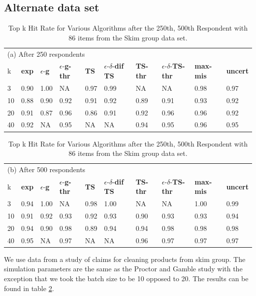 \documentclass[a4paper,12pt]{article}
\newcommand{\fixedexpressS}{\textbf{exp}}
\newcommand{\egreedyS}{$\epsilon$-\textbf{g}}
\newcommand{\egreedythresS}{$\epsilon$-\textbf{g-thr}}
\newcommand{\misminS}{\textbf{max-mis}}
\newcommand{\tsS}{\textbf{TS} }
\newcommand{\edtsS}{$\epsilon$-$\delta$-\textbf{dif TS} }
\newcommand{\tsthresS}{\textbf{TS-thr} }
\newcommand{\edtsthresS}{$\epsilon$-$\delta$-\textbf{TS-thr} }
\newcommand{\uncertS}{\textbf{uncert} }
\begin{document}
\subsection{Alternate data set}
\begin{table}
\caption{Top k Hit Rate for Various Algorithms after the {250th, 500th} Respondent with 86 items from the Skim group data set.
 }
\label{table:skim}
\begin{center}
\begin{tabular}{llllllllll}
\hline 
\hline
\multicolumn{10}{l}{(a) After 250 respondents}\\
k &  \fixedexpressS&\egreedyS&\egreedythresS&\tsS&\edtsS&\tsthresS&\edtsthresS& \misminS& \uncertS \\ \hline
  3 & 0.90 &   1.00 &  NA &   0.97 & 0.99 & NA & NA &    0.98 &   0.97 \\
  10 &  0.88 &   0.90 & 0.92 &   0.91 & 0.92 & 0.89 & 0.91 &    0.93 &   0.92 \\
  20 & 0.91 & 0.87 &  0.96 & 0.86 & 0.91 & 0.92 & 0.96 &  0.96 &   0.92 \\  
  40 &  0.92 &   NA &  0.95 &  NA & NA & 0.94 & 0.95 &  0.96 &   0.95 \\
\hline
\hline
\end{tabular}
\begin{tabular}{llllllllll}
\multicolumn{10}{l}{(b) After 500 respondents}\\
k &  \fixedexpressS&\egreedyS&\egreedythresS&\tsS&\edtsS&\tsthresS&\edtsthresS& \misminS& \uncertS  \\
\hline
   3 & 0.94 & 1.00 & NA & 0.98 & 1.00 & NA & NA & 1.00 &   0.99 \\
  10 &  0.91 &   0.92 &  0.93 &   0.92 & 0.93 & 0.90 & 0.93 &    0.93 &   0.94 \\  
  20 &  0.94 &   0.90 & 0.98 &  0.89 & 0.94 & 0.94 & 0.98 &  0.98 &   0.98 \\ 
  40 &  0.95 &   NA & 0.97 & NA & NA & 0.96 &  0.97 & 0.97 & 0.97 \\
\hline 
\hline
\end{tabular}
\end{center}
\end{table}
We use data from a study of claims for cleaning products from skim group. The simulation parameters are the same as the Proctor and Gamble study with the exception that we took the batch size to be 10 opposed to 20. The results can be found in table \ref{table:skim}.
\end{document}
